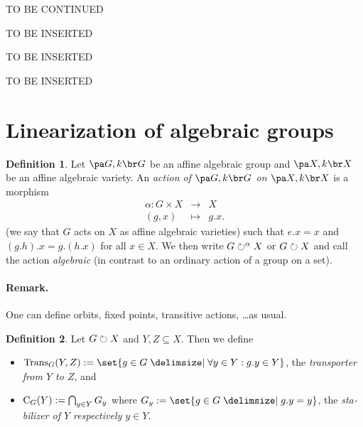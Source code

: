 \documentclass[12pt,a4paper]{scrartcl}
\theoremstyle{cplain}
\theoremstyle{cplain}
\theoremstyle{cplain}
\theoremstyle{definition}
\newtheorem*{deff}{Definition}
\begin{document}
\begin{otherlanguage}{english}
TO BE CONTINUED


TO BE INSERTED


TO BE INSERTED


TO BE INSERTED


\section{Linearization of algebraic groups}

\begin{deff}
  Let $\aav G$ be an affine algebraic group and $\aav X$ be an affine algebraic variety. An \emph{action of $\aav G$ on $\aav X$} is a morphism
  \begin{eqnarray*}
    \alpha\colon G\times X &\to& X\\
    (g,x) &\mapsto& g.x.
  \end{eqnarray*}
  (we say that $G$ acts on $X$ as affine algebraic varieties) such that $e.x = x$ and $(g.h).x = g.(h.x)$ for all $x\in X$. We then write $G \circlearrowright^\alpha X$ or $G \circlearrowright X$ and call the action \emph{algebraic} (in contrast to an ordinary action of a group on a set).
\end{deff}

\paragraph{Remark.}
One can define orbits, fixed points, transitive actions, \ldots as usual.

\begin{deff}
  Let $G\circlearrowright X$ and $Y,Z \subseteq X$. Then we define
  \begin{itemize}
  \item $\Trans_G(Y,Z) := \set{g\in G \given \forall y\in Y : g.y \in Y}$, the \emph{transporter from $Y$ to $Z$}, and
  \item $\operatorname{C}_G(Y) := \bigcap_{y\in Y} G_y$ where $G_y := \set{g \in G \given g.y = y}$, the \emph{stabilizer of $Y$ respectively $y\in Y$}.
  \end{itemize}
\end{deff}


\end{otherlanguage}
\end{document}
